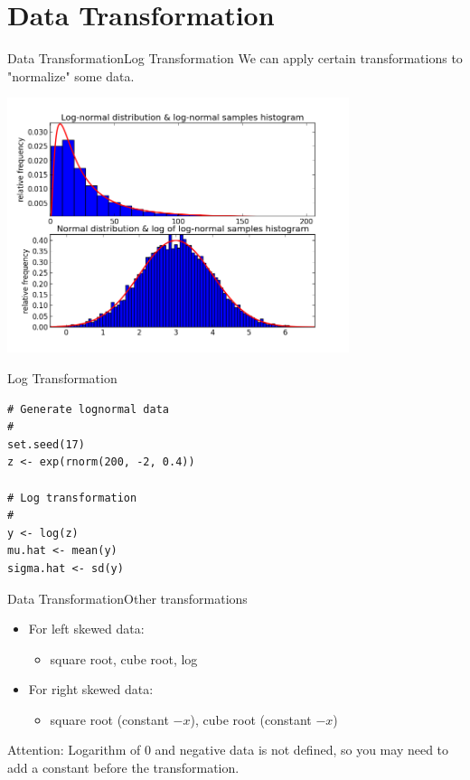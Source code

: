 \section{Data Transformation}

\begin{frame}{Data Transformation}{Log Transformation}
  We can apply certain transformations to "normalize" some data.
  \begin{center}
    \includegraphics[width=0.75\textwidth]{../img/lognormal_transformation}
  \end{center}
\end{frame}

\begin{frame}[fragile]{Log Transformation}{}
\begin{verbatim}
# Generate lognormal data
#
set.seed(17)
z <- exp(rnorm(200, -2, 0.4))

# Log transformation
#
y <- log(z)
mu.hat <- mean(y)
sigma.hat <- sd(y)
\end{verbatim}
\end{frame}

\begin{frame}{Data Transformation}{Other transformations}
  \begin{itemize}
    \item For left skewed data:
    \begin{itemize}
      \item square root, cube root, log
    \end{itemize}
    \item For right skewed data:
    \begin{itemize}
      \item square root (constant $-x$), cube root (constant $-x$)
    \end{itemize}
  \end{itemize}\bigskip

  Attention: Logarithm of 0 and negative data is not defined, so you may need to
  add a constant before the transformation.
\end{frame}




